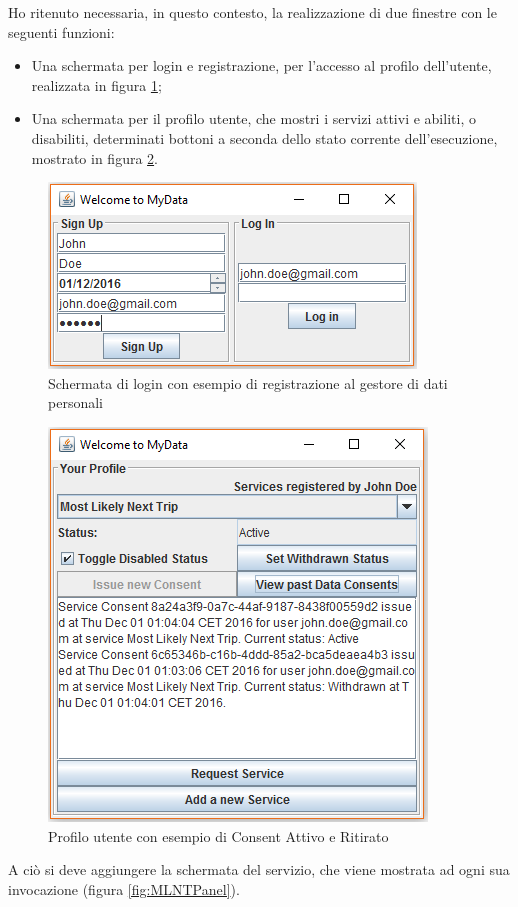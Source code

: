 Ho ritenuto necessaria, in questo contesto, la realizzazione di due finestre con le seguenti funzioni:
\begin{itemize}
	\item Una schermata per login e registrazione, per l’accesso al profilo dell’utente, realizzata in figura \ref{fig:welcomePanel};
	\item Una schermata per il profilo utente, che mostri i servizi attivi e abiliti, o disabiliti, determinati bottoni a seconda dello stato corrente dell’esecuzione, mostrato in figura \ref{fig:exampleConsentInProj}.
\end{itemize}
\begin{figure}
	\centering
	\includegraphics[width=0.5\linewidth]{pictures/welcomePanel.png}
	\caption{Schermata di login con esempio di registrazione al gestore di dati personali}
	\label{fig:welcomePanel}
\end{figure}
\begin{figure}
	\centering
	\includegraphics[width=0.5\linewidth]{pictures/exampleConsentInProj.png}
	\caption{Profilo utente con esempio di Consent Attivo e Ritirato}
	\label{fig:exampleConsentInProj}
\end{figure}
A ci\`o si deve aggiungere la schermata del servizio, che viene mostrata ad ogni sua invocazione (figura \ref{fig:MLNTPanel}).
